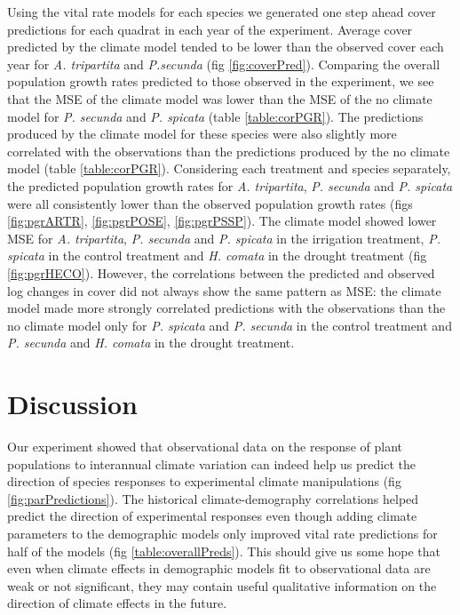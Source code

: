 \documentclass[11pt]{article}
\begin{document}
\begin{doublespace}
Using the vital rate models for each species we generated one step ahead cover predictions for each quadrat in each year of the experiment.  Average cover predicted by the climate model tended to be lower than the observed cover each year for \textit{A. tripartita} and \textit{P.secunda} (fig \ref{fig:coverPred}). Comparing the overall population growth rates predicted to those observed in the experiment, we see that the MSE of the climate model was lower than the MSE of the no climate model for \textit{P. secunda} and \textit{P. spicata} (table \ref{table:corPGR}). The predictions produced by the climate model for these species were also slightly more correlated with the observations than the predictions produced by the no climate model (table \ref{table:corPGR}). Considering each treatment and species separately, the predicted population growth rates for \textit{A. tripartita}, \textit{P. secunda} and \textit{P. spicata} were all consistently lower than the observed population growth rates (figs \ref{fig:pgrARTR}, \ref{fig:pgrPOSE}, \ref{fig:pgrPSSP}). The climate model showed lower MSE for \textit{A. tripartita}, \textit{P. secunda} and \textit{P. spicata} in the irrigation treatment, \textit{P. spicata} in the control treatment and \textit{H. comata} in the drought treatment (fig \ref{fig:pgrHECO}).  However, the correlations between the predicted and observed log changes in cover did not always show the same pattern as MSE: the climate model made more strongly correlated predictions with the observations than the no climate model only for \textit{P. spicata} and \textit{P. secunda} in the control treatment and \textit{P. secunda} and \textit{H. comata} in the drought treatment. 
  

\section*{Discussion}

Our experiment showed that observational data on the response of plant populations to interannual climate variation can indeed help us predict the direction of species responses to experimental climate manipulations (fig \ref{fig:parPredictions}). The historical climate-demography correlations helped predict the direction of experimental responses even though adding climate parameters to the demographic models only improved vital rate predictions for half of the models (fig \ref{table:overallPreds}). This should give us some hope that even when climate effects in demographic models fit to observational data are weak or not significant, they may contain useful qualitative information on the direction of climate effects in the future. 


\end{doublespace}
\end{document}
